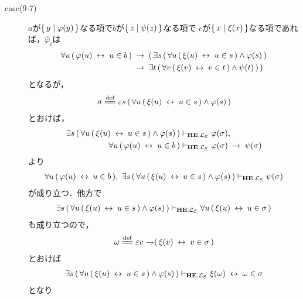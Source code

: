 \begin{metaprf}
\begin{description}
\begin{description}
					\item[case(9-7)] $a$が$\{\, y \mid \varphi(y)\, \}$なる項で$b$が$\{\, z \mid \psi(z)\, \}$なる項で
						$c$が$\{\, x \mid \xi(x)\, \}$なる項であれば，$\widehat{\varphi}_{i}$は
						\begin{align}
							\forall u\, (\, \varphi(u) \hspace{0.25em}\leftrightarrow\hspace{0.25em} u \in b\, ) 
							&\hspace{0.25em}\rightarrow\hspace{0.25em} (\, \exists s\, (\, \forall u\, (\, \xi(u) \hspace{0.25em}\leftrightarrow\hspace{0.25em} u \in s\, ) \wedge \varphi(s)\, ) \\
							&\hspace{0.25em}\rightarrow\hspace{0.25em} \exists t\, (\, \forall v\, (\, \xi(v) \hspace{0.25em}\leftrightarrow\hspace{0.25em} v \in t\, ) \wedge \psi(t)\, )\, )
						\end{align}
						となるが，
						\begin{align}
							\sigma \defeq \varepsilon s\, (\, \forall u\, (\, \xi(u) \lrarrow u \in s\, ) \wedge \varphi(s)\, )
						\end{align}
						とおけば，
						\begin{align}
							\exists s\, (\, \forall u\, (\, \xi(u) \lrarrow u \in s\, ) \wedge \varphi(s)\, ) 
							&\provable{\mbox{{\bf HE}},\lang{\varepsilon}} \varphi(\sigma), \\
							\forall u\, (\, \varphi(u) \lrarrow u \in b\, )
							&\provable{\mbox{{\bf HE}},\lang{\varepsilon}} \varphi(\sigma) \rarrow \psi(\sigma)
						\end{align}
						より
						\begin{align}
							\forall u\, (\, \varphi(u) \lrarrow u \in b\, ),\ 
							\exists s\, (\, \forall u\, (\, \xi(u) \lrarrow u \in s\, ) \wedge \varphi(s)\, ) 
							\provable{\mbox{{\bf HE}},\lang{\varepsilon}} \psi(\sigma)
						\end{align}
						が成り立つ．他方で
						\begin{align}
							\exists s\, (\, \forall u\, (\, \xi(u) \lrarrow u \in s\, ) \wedge \varphi(s)\, ) 
							\provable{\mbox{{\bf HE}},\lang{\varepsilon}} \forall u\, (\, \xi(u) \lrarrow u \in \sigma\, )
						\end{align}
						も成り立つので，
						\begin{align}
							\omega \defeq \varepsilon v \negation (\, \xi(v) \lrarrow v \in \sigma\, )
						\end{align}
						とおけば
						\begin{align}
							\exists s\, (\, \forall u\, (\, \xi(u) \lrarrow u \in s\, ) \wedge \varphi(s)\, ) 
							\provable{\mbox{{\bf HE}},\lang{\varepsilon}} \xi(\omega) \lrarrow \omega \in \sigma
						\end{align}
						となり
						\begin{align}

\end{align}
\end{description}
\end{description}
\end{metaprf}
